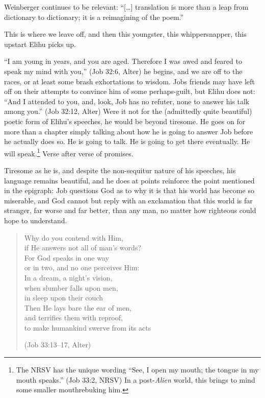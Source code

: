 Weinberger continues to be relevant: ``{[}\ldots{]} translation is more than a leap from dictionary to dictionary; it is a reimagining of the poem.'' \parencite[46]{wangwei}

This is where we leave off, and then this youngster, this whippersnapper, this upstart Elihu picks up.

``I am young in years, and you are aged. Therefore I was awed and feared to speak my mind with you,'' (Job 32:6, Alter) he begins, and we are off to the races, or at least some brash exhortations to wisdom. Jobs friends may have left off on their attempts to convince him of some perhaps-guilt, but Elihu does not: ``And I attended to you, and, look, Job has no refuter, none to answer his talk among you.'' (Job 32:12, Alter) Were it not for the (admittedly quite beautiful) poetic form of Elihu's speeches, he would be beyond tiresome. He goes on for more than a chapter simply talking about how he is going to answer Job before he actually does so. He is going to talk. He is going to get there eventually. He will speak.\footnote{The NRSV has the unique wording ``See, I open my mouth; the tongue in my mouth speaks.'' (Job 33:2, NRSV) In a post-\emph{Alien} world, this brings to mind some smaller mouth\footnotemark rebuking him.} Verse after verse of promises.

Tiresome as he is, and despite the non-sequitur nature of his speeches, his language remains beautiful, and he does at points reinforce the point mentioned in the epigraph: Job questions God as to why it is that his world has become so miserable, and God cannot but reply with an exclamation that this world is far stranger, far worse and far better, than any man, no matter how righteous could hope to understand.

\begin{verse}
Why do you contend with Him, \\
\vin if He answers not all of man's words? \\
For God speaks in one way \\
\vin or in two, and no one perceives Him: \\
In a dream, a night's vision, \\
\vin when slumber falls upon men, \\
\vin \vin in sleep upon their couch \\
Then He lays bare the ear of men, \\
\vin and terrifies them with reproof, \\
to make humankind swerve from its acts

(Job 33:13--17, Alter)
\end{verse}

